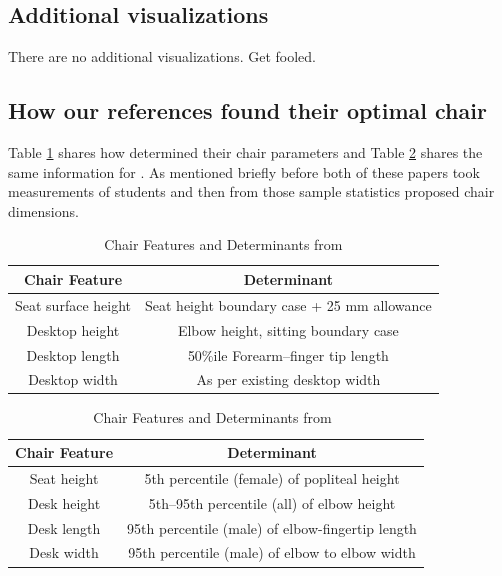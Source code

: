 \documentclass[conference]{IEEEtran}
\begin{document}
\subsection{Additional visualizations}

There are no additional visualizations. Get fooled.


\subsection*{How our references found their optimal chair}

Table \ref*{tab:determinants1} shares how \cite{mohamed} determined their chair parameters and Table \ref*{tab:determinants2} shares the same information for \cite{Ansari}. As mentioned briefly before both of these papers took measurements of students and then from those sample statistics proposed chair dimensions.

\begin{table}[H]
    \caption{Chair Features and Determinants from\cite{mohamed}}
    \begin{center}
    \begin{tabular}{c c}
    \toprule
    \textbf{Chair Feature} & \textbf{Determinant} \\
    \midrule
    Seat surface height & Seat height boundary case + 25 mm allowance \\
    \midrule
    Desktop height & Elbow height, sitting boundary case \\
    \midrule
    Desktop length & 50\%ile Forearm--finger tip length \\
    \midrule
    Desktop width & As per existing desktop width \\
    \bottomrule
    \end{tabular}
    \label{tab:determinants1}
    \end{center}
\end{table}

\begin{table}[H]
    \caption{Chair Features and Determinants from~\cite{Ansari}}
    \begin{center}
    \begin{tabular}{c c}
    \toprule
    \textbf{Chair Feature} & \textbf{Determinant} \\
    \midrule
    Seat height & 5th percentile (female) of popliteal height \\
    \midrule
    Desk height & 5th--95th percentile (all) of elbow height \\
    \midrule
    Desk length & 95th percentile (male) of elbow-fingertip length \\
    \midrule
    Desk width & 95th percentile (male) of elbow to elbow width \\
    \bottomrule
    \end{tabular}
    \label{tab:determinants2}
    \end{center}
\end{table}
\vfill
\end{document}
